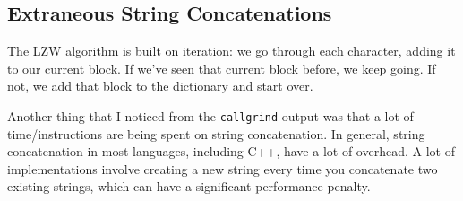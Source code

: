 \documentclass[12pt,twoside]{reedthesis}
\begin{document}
\hypertarget{extraneous-string-concatenations}{%
\subsection{Extraneous String Concatenations}\label{extraneous-string-concatenations}}

The LZW algorithm is built on iteration: we go through each character, adding it to our current block. If we've seen that current block before, we keep going. If not, we add that block to the dictionary and start over.

Another thing that I noticed from the \texttt{callgrind} output was that a lot of time/instructions are being spent on string concatenation. In general, string concatenation in most languages, including C++, have a lot of overhead. A lot of implementations involve creating a new string every time you concatenate two existing strings, which can have a significant performance penalty.
\end{document}
